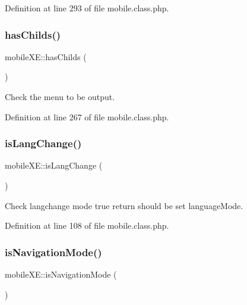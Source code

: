 Definition at line 293 of file mobile.\+class.\+php.

\hypertarget{classmobileXE_a680f6a6b774bf12be4c67b6a9215f1ea}{}\label{classmobileXE_a680f6a6b774bf12be4c67b6a9215f1ea} 
\subsubsection{\texorpdfstring{has\+Childs()}{hasChilds()}}
{\footnotesize\ttfamily mobile\+X\+E\+::has\+Childs (\begin{DoxyParamCaption}{ }\end{DoxyParamCaption})}



Check the menu to be output. 



Definition at line 267 of file mobile.\+class.\+php.

\hypertarget{classmobileXE_adc3005704a5d02608a754c208b11c04c}{}\label{classmobileXE_adc3005704a5d02608a754c208b11c04c} 
\subsubsection{\texorpdfstring{is\+Lang\+Change()}{isLangChange()}}
{\footnotesize\ttfamily mobile\+X\+E\+::is\+Lang\+Change (\begin{DoxyParamCaption}{ }\end{DoxyParamCaption})}



Check langchange mode true return should be set language\+Mode. 



Definition at line 108 of file mobile.\+class.\+php.

\hypertarget{classmobileXE_a7adfc4319f2a666887b659f6d01ef4da}{}\label{classmobileXE_a7adfc4319f2a666887b659f6d01ef4da} 
\subsubsection{\texorpdfstring{is\+Navigation\+Mode()}{isNavigationMode()}}
{\footnotesize\ttfamily mobile\+X\+E\+::is\+Navigation\+Mode (\begin{DoxyParamCaption}{ }\end{DoxyParamCaption})}



